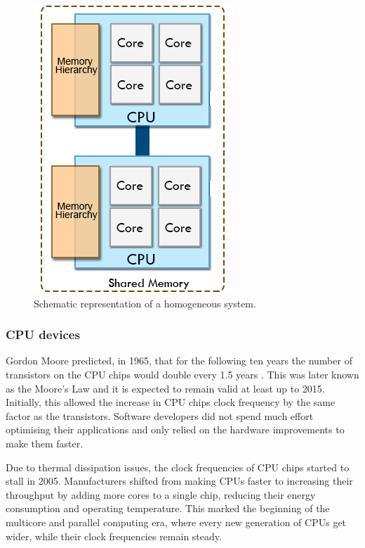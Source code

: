 \begin{figure}[!htp]
	\begin{center}
		\includegraphics[scale=0.45]{imgs/homoplats.png}
		\caption{Schematic representation of a homogeneous system.}
		\label{fig:homoplat}
	\end{center}
\end{figure}

\subsubsection*{CPU devices}
\label{cpu_devices}

Gordon Moore predicted, in 1965, that for the following ten years the number of transistors on the CPU chips would double every 1.5 years \cite{MooreLaw}. This was later known as the Moore’s Law and it is expected to remain valid at least up to 2015. Initially, this allowed the increase in CPU chips clock frequency by the same factor as the transistors. Software developers did not spend much effort optimising their applications and only relied on the hardware improvements to make them faster.

Due to thermal dissipation issues, the clock frequencies of CPU chips started to stall in 2005. Manufacturers shifted from making CPUs faster to increasing their throughput by adding more cores to a single chip, reducing their energy consumption and operating temperature. This marked the beginning of the multicore and parallel computing era, where every new generation of CPUs get wider, while their clock frequencies remain steady.

